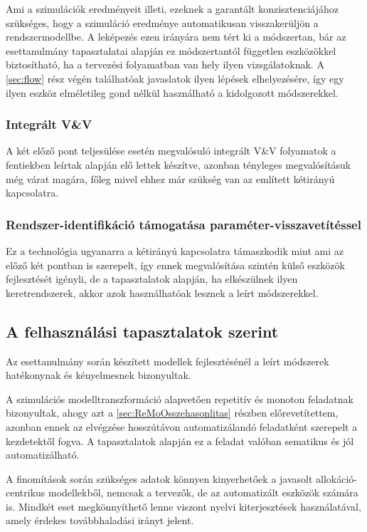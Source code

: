             Ami a szimulációk eredményeit illeti, ezeknek a garantált konzisztenciájához szükséges, hogy a szimuláció eredménye automatikusan visszakerüljön a rendszermodellbe.
            A leképezés ezen irányára nem tért ki a módszertan, bár az esettanulmány tapasztalatai alapján ez módszertantól független eszközökkel biztosítható, ha a tervezési folyamatban van hely ilyen vizsgálatoknak.
            A \ref{sec:flow} rész végén találhatóak javaslatok ilyen lépések elhelyezésére, így egy ilyen eszköz elméletileg gond nélkül használható a kidolgozott módszerekkel.

            \subsubsection{Integrált V\&V}
            A két előző pont teljesülése esetén megvalósuló integrált V\&V folyamatok a fentiekben leírtak alapján elő lettek készítve, azonban tényleges megvalósításuk még várat magára, főleg mivel ehhez már szükség van az említett kétirányú kapcsolatra.
            
            \subsubsection{Rendszer-identifikáció támogatása paraméter-visszavetítéssel}
            Ez a technológia ugyanarra a kétirányú kapcsolatra támaszkodik mint ami az előző két pontban is szerepelt, így ennek megvalósítása szintén külső eszközök fejlesztését igényli, de a tapasztalatok alapján, ha elkészülnek ilyen keretrendszerek, akkor azok használhatóak lesznek a leírt módszerekkel.

    \subsection{A felhasználási tapasztalatok szerint}
    Az esettanulmány során készített modellek fejlesztésénél a leírt módszerek hatékonynak és kényelmesnek bizonyultak.
    
    A szimulációs modelltranszformáció alapvetően repetitív és monoton feladatnak bizonyultak, ahogy azt a \ref{sec:ReMoOsszehasonlitas} részben előrevetítettem, azonban ennek az elvégzése hosszútávon automatizálandó feladatként szerepelt a kezdetektől fogva.
    A tapasztalatok alapján ez a feladat valóban sematikus és jól automatizálható.
    
    A finomítások során szükséges adatok könnyen kinyerhetőek a javasolt allokáció-centrikus modellekből, nemcsak a tervezők, de az automatizált eszközök számára is. Mindkét eset megkönnyíthető lenne viszont nyelvi kiterjesztések használatával, amely érdekes továbbhaladási irányt jelent.